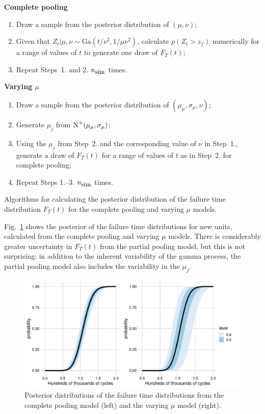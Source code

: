 \begin{table}
\centering
\begin{multicols}{2}

\textbf{Complete pooling}
\begin{enumerate}
    \item Draw a sample from the posterior distribution of $(\mu, \nu)$;
    \item Given that $Z_t|\mu, \nu \sim \mbox{Ga}(t/\nu^2, 1/\mu \nu^2)$, calculate $p(Z_t > z_f)$ numerically for a range of values of $t$ to generate one draw of $F_T(t)$;
    \item Repeat Steps~1. and 2. $n_{\hbox{\small{sim}}}$ times.
\end{enumerate}

\columnbreak

\textbf{Varying $\mu$}
\begin{enumerate}
    \item Draw a sample from the posterior distribution of $(\mu_\mu, \sigma_\mu, \nu)$;
    \item Generate $\mu_j$ from $\hbox{N}^{+}(\mu_\mu, \sigma_\mu)$;
    \item Using the $\mu_j$ from Step~2. and the corresponding value of $\nu$ in Step~1., generate a draw of $F_T(t)$ for a range of values of $t$ as in Step~2. for complete pooling;
    \item Repeat Steps 1.--3. $n_{\hbox{\small{sim}}}$ times.
\end{enumerate}

\end{multicols}
\caption{Algorithms for calculating the posterior distribution of the failure time distribution $F_T(t)$ for the complete pooling and varying $\mu$ models.}\label{fig:FT_algs}
\end{table}

Fig.~\ref{fig:FT_CP_VM_new} shows the posterior of the failure time distributions for new units, calculated from the complete pooling and varying $\mu$ models. There is considerably greater uncertainty in $F_T(t)$ from the partial pooling model, but this is not surprising: in addition to the inherent variability of the gamma process, the partial pooling model also includes the variability in the $\mu_j$. 

\begin{figure}[h]
    \centering
    \includegraphics[width=0.95\columnwidth]{./figures/ch-5/FT_dist.pdf}
    \caption{Posterior distributions of the failure time distributions from the complete pooling model (left) and the varying $\mu$ model (right).}
    \label{fig:FT_CP_VM_new}
\end{figure}

